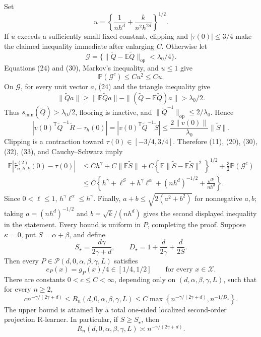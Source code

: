 Set
\[
 u=\left\{\frac1{nh^d}+\frac{k}{n^2h^{2d}}\right\}^{1/2}.
 \tag{31}
\]
If \(u\) exceeds a sufficiently small fixed constant, clipping and \(|\tau(0)|\leq3/4\) make the claimed inequality immediate after enlarging \(C\).  Otherwise let
\[
 \mathcal G=\{\|\widetilde Q-\mathbb E\widetilde Q\|_{\mathrm{op}}<\lambda_0/4\}.
\]
Equations (24) and (30), Markov's inequality, and \(u\leq1\) give
\[
 \mathbb P(\mathcal G^c)\leq Cu^2\leq Cu.
 \tag{32}
\]
On \(\mathcal G\), for every unit vector \(a\), (24) and the triangle inequality give
\[
 \|\widetilde Qa\|
 \geq\|\mathbb E\widetilde Qa\|-\|(\widetilde Q-\mathbb E\widetilde Q)a\|
 >\lambda_0/2.
\]
Thus \(s_{\min}(\widetilde Q)>\lambda_0/2\), flooring is inactive, and \(\|\widetilde Q^{-1}\|_{\mathrm{op}}\leq2/\lambda_0\).  Hence
\[
 \left|v(0)^{\mathsf T}\widetilde Q^{-1}\widetilde R-\tau_h(0)\right|
 =\left|v(0)^{\mathsf T}\widetilde Q^{-1}\widetilde S\right|
 \leq\frac{2\|v(0)\|}{\lambda_0}\|\widetilde S\|.
 \tag{33}
\]
Clipping is a contraction toward \(\tau(0)\in[-3/4,3/4]\).  Therefore (11), (20), (30), (32), (33), and Cauchy--Schwarz imply
\[
 \begin{split}
 \mathbb E\left|\widehat\tau^{(2)}_{n,h,k}(0)-\tau(0)\right|
 &\leq Ch^\gamma+C\|\mathbb E\widetilde S\|
 +C\left\{\mathbb E\|\widetilde S-\mathbb E\widetilde S\|^2\right\}^{1/2}
 +\frac32\mathbb P(\mathcal G^c)\\
 &\leq C\left\{h^\gamma+\ell^S+h^\gamma\ell^\alpha
 +(nh^d)^{-1/2}+\frac{\sqrt{k}}{nh^d}\right\}.
 \end{split}
 \tag{34}
\]
Since \(0<\ell\leq1\), \(h^\gamma\ell^\alpha\leq h^\gamma\).  Finally, \(a+b\leq\sqrt{2(a^2+b^2)}\) for nonnegative \(a,b\); taking \(a=(nh^d)^{-1/2}\) and \(b=\sqrt{k}/(nh^d)\) gives the second displayed inequality in the statement.  Every bound is uniform in \(P\), completing the proof.
Suppose \(\kappa=0\), put \(S=\alpha+\beta\), and define
\[
 S_\star=\frac{d\gamma}{2\gamma+d},
 \qquad
 D_\star=1+\frac d{2\gamma}+\frac d{2S}.
\]
Then every \(P\in\mathcal P(d,0,\alpha,\beta,\gamma,L)\) satisfies
\[
 e_P(x)=g_P(x)/4\in[1/4,1/2]
 \qquad\text{for every }x\in\mathcal X.
\]
There are constants \(0<c\leq C<\infty\), depending only on \((d,\alpha,\beta,\gamma,L)\), such that for every \(n\geq2\),
\[
 c n^{-\gamma/(2\gamma+d)}
 \leq R_n(d,0,\alpha,\beta,\gamma,L)
 \leq C\max\left\{n^{-\gamma/(2\gamma+d)},
 n^{-1/D_\star}\right\}.
\]
The upper bound is attained by a total one-sided localized second-order projection R-learner.  In particular, if \(S\geq S_\star\), then
\[
 R_n(d,0,\alpha,\beta,\gamma,L)
 \asymp n^{-\gamma/(2\gamma+d)}.
\]

